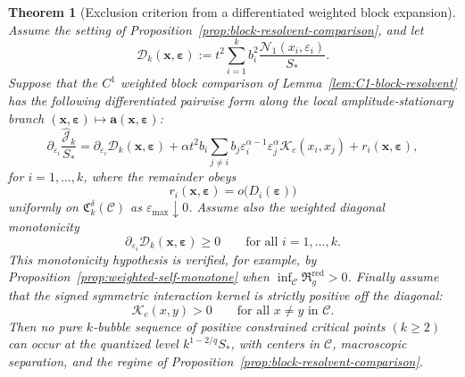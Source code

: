 \documentclass[11pt,reqno,a4paper]{amsart}
\numberwithin{equation}{section}
\theoremstyle{plain}
\newtheorem{theorem}{Theorem}[section]
\theoremstyle{remark}
\theoremstyle{plain}
\begin{document}
\begin{theorem}[Exclusion criterion from a differentiated weighted block expansion]
\label{thm:no-pure-kge2-from-J1}
Assume the setting of Proposition~\ref{prop:block-resolvent-comparison}, and let
\[
\mathcal D_k(\mathbf x,\boldsymbol\varepsilon)
:=t^2\sum_{i=1}^k b_i^2\frac{\mathcal N_1(x_i,\varepsilon_i)}{S_\ast}.
\]
Suppose that the $C^1$ weighted block comparison of
Lemma~\ref{lem:C1-block-resolvent} has the following differentiated pairwise form
along the local amplitude-stationary branch
$(\mathbf x,\boldsymbol\varepsilon)\mapsto\mathbf a(\mathbf x,\boldsymbol\varepsilon)$:
\begin{equation}\label{eq:dJk-weighted-criterion}
\partial_{\varepsilon_i}\frac{\hat{\mathcal J}_k}{S_\ast}
=
\partial_{\varepsilon_i}\mathcal D_k(\mathbf x,\boldsymbol\varepsilon)
+\alpha t^2 b_i
\sum_{j\neq i}b_j
\varepsilon_i^{\alpha-1}\varepsilon_j^{\alpha}
\mathcal K_c(x_i,x_j)
+r_i(\mathbf x,\boldsymbol\varepsilon),
\end{equation}
for $i=1,\dots,k$, where the remainder obeys
\begin{equation}\label{eq:dJk-weighted-criterion-r}
r_i(\mathbf x,\boldsymbol\varepsilon)
=o\bigl(D_i(\boldsymbol\varepsilon)\bigr)
\end{equation}
uniformly on $\mathfrak C_k^\delta(\mathcal C)$ as $\varepsilon_{\max}\downarrow0$.
Assume also the weighted diagonal monotonicity
\begin{equation}\label{eq:weighted-self-monotone}
\partial_{\varepsilon_i}\mathcal D_k(\mathbf x,\boldsymbol\varepsilon)\ge0
\qquad\text{for all }i=1,\dots,k.
\end{equation}
This monotonicity hypothesis is verified, for example, by
Proposition~\ref{prop:weighted-self-monotone} when
$\inf_{\mathcal C}\mathfrak R_g^{\mathrm{red}}>0$.  Finally assume that the
signed symmetric interaction kernel is strictly positive off the diagonal:
\begin{equation}\label{eq:signed-G-positive-on-C}
\mathcal K_c(x,y)>0
\qquad\text{for all }x\neq y\text{ in }\mathcal C.
\end{equation}
Then no pure $k$-bubble sequence of positive constrained critical points
$(k\ge2)$ can occur at the quantized level $k^{1-2/q}S_\ast$,
with centers in $\mathcal C$, macroscopic separation, and the regime of
Proposition~\ref{prop:block-resolvent-comparison}.
\end{theorem}
\end{document}

